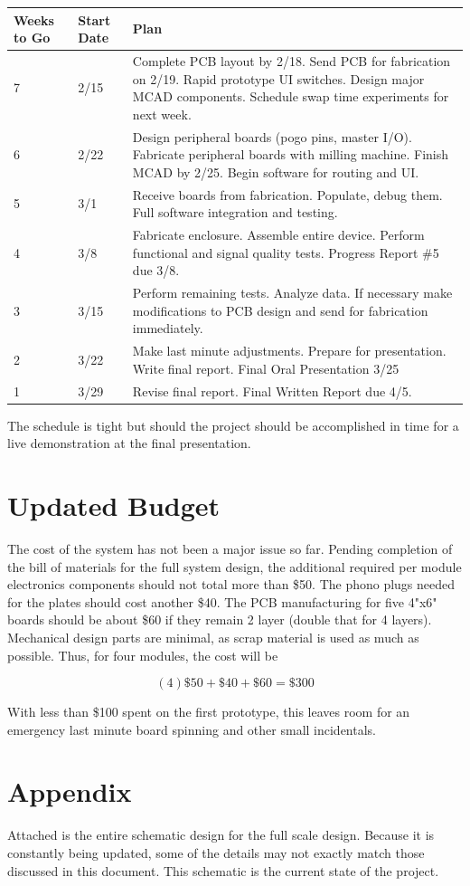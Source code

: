 \documentclass{article}
\begin{document}
	\begin{table}[H]
	\begin{tabular}{llp{4in}}
	Weeks to Go   & Start Date         & Plan \\
	\hline

	7 & 2/15 &  Complete PCB layout by 2/18.  Send PCB for fabrication on 2/19.  Rapid prototype UI switches.  Design major MCAD components.  Schedule swap time experiments for next week.\\
	6 & 2/22 &  Design peripheral boards (pogo pins, master I/O).  Fabricate peripheral boards with milling machine.  Finish MCAD by 2/25. Begin software for routing and UI. \\
	5 & 3/1  &  Receive boards from fabrication.  Populate, debug them.  Full software integration and testing.  \\
	4 & 3/8  &  Fabricate enclosure.  Assemble entire device.  Perform functional and signal quality tests.  Progress Report \#5 due 3/8.  \\
	3 & 3/15 &  Perform remaining tests.  Analyze data. If necessary make modifications to PCB design and send for fabrication immediately.   \\
	2 & 3/22 &  Make last minute adjustments.  Prepare for presentation.  Write final report.  Final Oral Presentation 3/25  \\
	1 & 3/29 &  Revise final report.  Final Written Report due 4/5.    
	\end{tabular}
	\end{table}

	The schedule is tight but should the project should be accomplished in time for a live demonstration at the final presentation.

	\section{Updated Budget}

	The cost of the system has not been a major issue so far.  Pending completion of the bill of materials for the full system design, the additional required per module electronics components should not total more than \$50.  The phono plugs needed for the plates should cost another \$40.  The PCB manufacturing for five 4"x6" boards should be about \$60 if they remain 2 layer (double that for 4 layers).  Mechanical design parts are minimal, as scrap material is used as much as possible.  Thus, for four modules, the cost will be 

	$$ (4)\$50 + \$40 + \$60 = \$300 $$

	With less than \$100 spent on the first prototype, this leaves room for an emergency last minute board spinning and other small incidentals.

\newpage



\section{Appendix}
Attached is the entire schematic design for the full scale design.  Because it is constantly being updated, some of the details may not exactly match those discussed in this document.  This schematic is the current state of the project.
\end{document}
